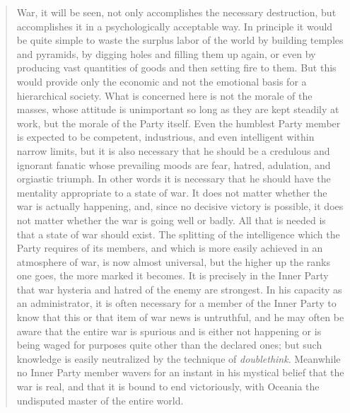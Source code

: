 \begin{quotation}
War, it will be seen, not only accomplishes the necessary destruction,
but accomplishes it in a psychologically acceptable way. In principle it
would be quite simple to waste the surplus labor of the world by
building temples and pyramids, by digging holes and filling them up
again, or even by producing vast quantities of goods and then setting
fire to them. But this would provide only the economic and not the
emotional basis for a hierarchical society. What is concerned here is
not the morale of the masses, whose attitude is unimportant so long as
they are kept steadily at work, but the morale of the Party itself. Even
the humblest Party member is expected to be competent, industrious, and
even intelligent within narrow limits, but it is also necessary that he
should be a credulous and ignorant fanatic whose prevailing moods are
fear, hatred, adulation, and orgiastic triumph. In other words it is
necessary that he should have the mentality appropriate to a state of
war. It does not matter whether the war is actually happening, and,
since no decisive victory is possible, it does not matter whether the
war is going well or badly. All that is needed is that a state of war
should exist. The splitting of the intelligence which the Party requires
of its members, and which is more easily achieved in an atmosphere of
war, is now almost universal, but the higher up the ranks one goes, the
more marked it becomes. It is precisely in the Inner Party that war
hysteria and hatred of the enemy are strongest. In his capacity as an
administrator, it is often necessary for a member of the Inner Party to
know that this or that item of war news is untruthful, and he may often
be aware that the entire war is spurious and is either not happening or
is being waged for purposes quite other than the declared ones; but such
knowledge is easily neutralized by the technique of \emph{doublethink}.
Meanwhile no Inner Party member wavers for an instant in his mystical
belief that the war is real, and that it is bound to end victoriously,
with Oceania the undisputed master of the entire world.


\end{quotation}
